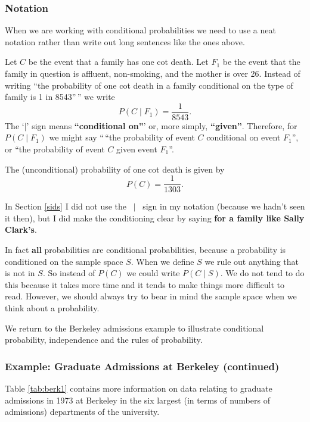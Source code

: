 \documentclass[
  british,
  11pt,
  openany, a4paper]{book}
\begin{document}
\subsubsection*{Notation}\label{notation}

When we are working with conditional probabilities we need to use a neat notation rather than write out long sentences like the ones above.

Let \(C\) be the event that a family has one cot death. Let \(F_1\) be the event that the family in question is affluent, non-smoking, and the mother is over 26. Instead of writing ``the probability of one cot death in a family conditional on the type of family is 1 in 8543''\,'' we write
\[P(C \mid F_1) = \frac{1}{8543}.\]
The `\(\mid\)' sign means \textbf{``conditional on''}' or, more simply, \textbf{``given''}. Therefore, for \(P(C \mid F_1)\) we might say ``\,``the probability of event \(C\) conditional on event \(F_1\)'', or ``the probability of event \(C\) given event \(F_1\)''.

The (unconditional) probability of one cot death is given by
\[P(C) = \frac{1}{1303}.\]

In Section \ref{sids} I did not use the \(~\mid~\) sign in my notation (because we hadn't seen it then), but I did make the conditioning clear by saying \textbf{for a family like Sally Clark's}.

In fact \textbf{all} probabilities are conditional probabilities, because a probability is conditioned on the sample space \(S\). When we define \(S\) we rule out anything that is not in \(S\). So instead of \(P(C)\) we could write \(P(C \mid S)\). We do not tend to do this because it takes more time and it tends to make things more difficult to read. However, we should always try to bear in mind the sample space when we think about a probability.

We return to the Berkeley admissions example to illustrate conditional probability, independence and the rules of probability.

\subsubsection*{Example: Graduate Admissions at Berkeley (continued)}\label{example-graduate-admissions-at-berkeley-continued}

Table \ref{tab:berk1} contains more information on data relating to graduate admissions in 1973 at Berkeley in the six largest (in terms of numbers of admissions) departments of the university.
\end{document}
